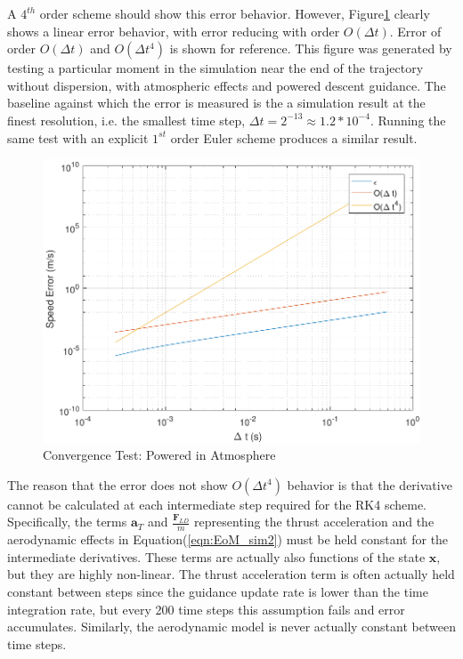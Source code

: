 A $4^{th}$ order scheme should show this error behavior. However, Figure\:\ref{fig:convtestatmo} clearly shows a linear error behavior, with error reducing with order $O(\Delta t)$. Error of order $O(\Delta t)$ and $O(\Delta t ^4)$ is shown for reference. This figure was generated by testing a particular moment in the simulation near the end of the trajectory without dispersion, with atmospheric effects and powered descent guidance. The baseline against which the error is measured is the a simulation result at the finest resolution, i.e. the smallest time step, $\Delta t = 2^{-13} \approx 1.2*10^{-4}$. Running the same test with an explicit $1^{st}$ order Euler scheme produces a similar result. 
\begin{figure}[H]
	\centering
	\begin{minipage}{4.3 in}
		\includegraphics[width=\linewidth]{Figures/convtestatmo.pdf}
		\caption{Convergence Test: Powered in Atmosphere \label{fig:convtestatmo} }
	\end{minipage}
\end{figure}


The reason that the error does not show $O(\Delta t^4)$ behavior is that the derivative cannot be calculated at each intermediate step required for the RK4 scheme. Specifically, the terms $\bm{a}_T$ and $\frac{\bm{F}_{LD}}{m}$ representing the thrust acceleration and the aerodynamic effects in Equation\:(\ref{eqn:EoM_sim2}) must be held constant for the intermediate derivatives. These terms are actually also functions of the state $\bm{x}$, but they are highly non-linear. The thrust acceleration term is often actually held constant between steps since the guidance update rate is lower than the time integration rate, but every 200 time steps this assumption fails and error accumulates. Similarly, the aerodynamic model is never actually constant between time steps.

